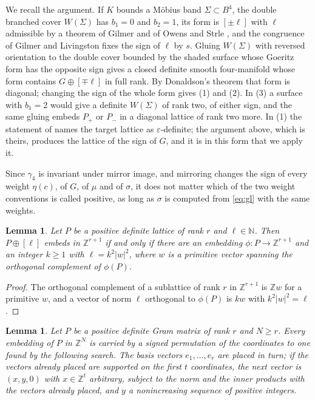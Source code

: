 \documentclass[11pt]{amsart}
\newtheorem{lemma}[theorem]{Lemma}
\theoremstyle{definition}
\theoremstyle{remark}
\numberwithin{equation}{section}
\begin{document}
We recall the argument. If $K$ bounds a M\"obius band $\Sigma\subset B^4$, the double
branched cover $W(\Sigma)$ has $b_1=0$ \cite{JK} and $b_2=1$, its form is $[\pm\ell]$ with
$\ell$ admissible by a theorem of Gilmer and of Owens and Strle \cite[Corollary 2.8]{JK},
and the congruence of Gilmer and Livingston \cite{GiL} fixes the sign of $\ell$ by $s$.
Gluing $W(\Sigma)$ with reversed orientation to the double cover bounded by the shaded
surface whose Goeritz form has the opposite sign gives a closed definite smooth
four-manifold whose form contains $G\oplus[\mp\ell]$ in full rank. By Donaldson's theorem
\cite{Do} that form is diagonal; changing the sign of the whole form gives (1) and (2). In
(3) a surface with $b_1=2$ would give a definite $W(\Sigma)$ of rank two, of either sign,
and the same gluing embeds $P_+$ or $P_-$ in a diagonal lattice of rank two more. In (1) the
statement of \cite{JK} names the target lattice as $\varepsilon$-definite; the argument
above, which is theirs, produces the lattice of the sign of $G$, and it is in this form that
we apply it.

Since $\gamma_4$ is invariant under mirror image, and mirroring changes the sign of every
weight $\eta(c)$, of $G$, of $\mu$ and of $\sigma$, it does not matter which of the two
weight conventions is called positive, as long as $\sigma$ is computed from \eqref{eq:gl}
with the same weights.

\begin{lemma}\label{lem:complement}
Let $P$ be a positive definite lattice of rank $r$ and $\ell\in\mathbb N$. Then
$P\oplus[\ell]$ embeds in $\mathbb Z^{r+1}$ if and only if there are an embedding
$\phi\colon P\to\mathbb Z^{r+1}$ and an integer $k\ge1$ with $\ell=k^2|w|^2$, where $w$ is a
primitive vector spanning the orthogonal complement of $\phi(P)$.
\end{lemma}

\begin{proof}
The orthogonal complement of a sublattice of rank $r$ in $\mathbb Z^{r+1}$ is $\mathbb Z w$
for a primitive $w$, and a vector of norm $\ell$ orthogonal to $\phi(P)$ is $kw$ with
$k^2|w|^2=\ell$.
\end{proof}

\begin{lemma}\label{lem:search}
Let $P$ be a positive definite Gram matrix of rank $r$ and $N\ge r$. Every embedding of $P$
in $\mathbb Z^N$ is carried by a signed permutation of the coordinates to one found by the
following search. The basis vectors $e_1,\dots,e_r$ are placed in turn; if the vectors
already placed are supported on the first $t$ coordinates, the next vector is
$(x,y,0)$ with $x\in\mathbb Z^t$ arbitrary, subject to the norm and the inner products with
the vectors already placed, and $y$ a nonincreasing sequence of positive integers.
\end{lemma}
\end{document}
